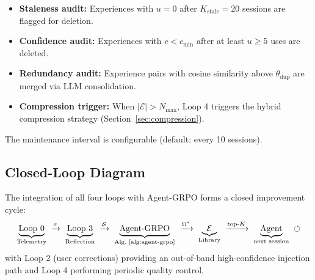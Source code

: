 \begin{itemize}[leftmargin=1.5em]
    \item \textbf{Staleness audit:} Experiences with $u = 0$ after
          $K_{\text{stale}} = 20$ sessions are flagged for deletion.
    \item \textbf{Confidence audit:} Experiences with $c < c_{\text{min}}$
          after at least $u \geq 5$ uses are deleted.
    \item \textbf{Redundancy audit:} Experience pairs with cosine similarity
          above $\theta_{\text{dup}}$ are merged via LLM consolidation.
    \item \textbf{Compression trigger:} When $|\mathcal{E}| > N_{\max}$,
          Loop 4 triggers the hybrid compression strategy
          (Section~\ref{sec:compression}).
\end{itemize}

The maintenance interval is configurable (default: every 10 sessions).

\subsection{Closed-Loop Diagram}

The integration of all four loops with Agent-GRPO forms a closed improvement
cycle:
\begin{equation}
    \underbrace{\text{Loop 0}}_{\text{Telemetry}}
    \;\xrightarrow{\tau}\;
    \underbrace{\text{Loop 3}}_{\text{Reflection}}
    \;\xrightarrow{\mathcal{S}}\;
    \underbrace{\text{Agent-GRPO}}_{\text{Alg.~\ref{alg:agent-grpo}}}
    \;\xrightarrow{\Omega^*}\;
    \underbrace{\mathcal{E}}_{\text{Library}}
    \;\xrightarrow{\text{top-}K}\;
    \underbrace{\text{Agent}}_{\text{next session}}
    \;\circlearrowleft
    \label{eq:closed-loop}
\end{equation}
with Loop 2 (user corrections) providing an out-of-band high-confidence
injection path and Loop 4 performing periodic quality control.

